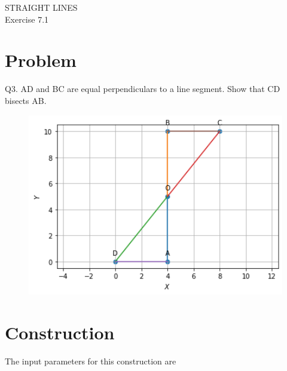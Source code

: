 \documentclass[10pt,a4paper]{article}
\title{\mytitle}
\begin{document}
\begin{center}
\textbf\large{ STRAIGHT LINES}\\
\textbf\large{Exercise 7.1}
\end{center}

\tableofcontents
\section{Problem}
Q3. AD and BC are equal perpendiculars to a line segment. Show that CD bisects AB.
\begin{figure}[!h]
	\begin{center}
		\includegraphics[width=5in]{./figs/figure.png}
	\end{center}
\caption{}
\label{figure}
\end{figure}
\pagebreak
\section{Construction}
The input parameters for this construction are
\begin{table}[!h]
\centering

\caption{}
\label{Inputs}
\end{table}
\end{document}
